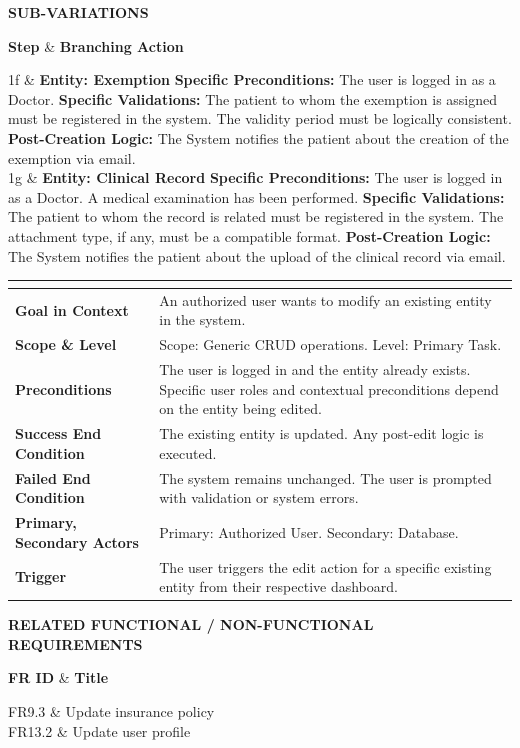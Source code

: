 \documentclass[12pt, a4paper]{article}
\newcommand{\usecaseheader}[9]{
    \vspace{0.5cm}
    \noindent
    \renewcommand{\arraystretch}{1.5}
    \begin{tabularx}{\textwidth}{|>{\columncolor{gray!20}\bfseries}p{4.5cm}|X|}
    \hline
    \rowcolor{blue!10}
    \multicolumn{2}{|c|}{\textbf{USE CASE #1: #2}} \\ \hline
    Goal in Context & #3 \\ \hline
    Scope \& Level & #4 \\ \hline
    Preconditions & #5 \\ \hline
    Success End Condition & #6 \\ \hline
    Failed End Condition & #7 \\ \hline
    Primary, Secondary Actors & #8 \\ \hline
    Trigger & #9 \\ \hline
    \end{tabularx}
    \par\vspace{0.2cm}
}
\newenvironment{ucsubvariations}{
    \noindent\textbf{SUB-VARIATIONS} \par \vspace{0.1cm}
    \noindent
    \renewcommand{\arraystretch}{1.3}
    \tabularx{\textwidth}{|>{\centering\arraybackslash}p{1.2cm}|X|}
    \hline
    \rowcolor{gray!30}
    \textbf{Step} & \textbf{Branching Action} \\ \hline
}{
    \endtabularx
    \par\vspace{0.5cm}
}
\newenvironment{ucrequirements}{
    \noindent\textbf{RELATED FUNCTIONAL / NON-FUNCTIONAL REQUIREMENTS} \par \vspace{0.1cm}
    \noindent
    \renewcommand{\arraystretch}{1.3}
    \tabularx{\textwidth}{|>{\centering\arraybackslash\bfseries}p{2.5cm}|X|}
    \hline
    \rowcolor{gray!30}
    \textbf{FR ID} & \textbf{Title} \\ \hline
}{
    \endtabularx
    \par\vspace{0.5cm}
}
\begin{document}
\begin{ucsubvariations}
    1f & \textbf{Entity: Exemption}\newline
         \textbf{Specific Preconditions:} The user is logged in as a Doctor.\newline
         \textbf{Specific Validations:} The patient to whom the exemption is assigned must be registered in the system. The validity period must be logically consistent.\newline
         \textbf{Post-Creation Logic:} The System notifies the patient about the creation of the exemption via email. \\ \hline
    1g & \textbf{Entity: Clinical Record}\newline
         \textbf{Specific Preconditions:} The user is logged in as a Doctor. A medical examination has been performed.\newline
         \textbf{Specific Validations:} The patient to whom the record is related must be registered in the system. The attachment type, if any, must be a compatible format.\newline
         \textbf{Post-Creation Logic:} The System notifies the patient about the upload of the clinical record via email. \\ \hline
\end{ucsubvariations}
{}
\usecaseheader
  {UC2}  %
  {Entity Edit} %
  {An authorized user wants to modify an existing entity in the system.} %
  {Scope: Generic CRUD operations. Level: Primary Task.} %
  {The user is logged in and the entity already exists. Specific user roles and contextual preconditions depend on the entity being edited.} %
  {The existing entity is updated. Any post-edit logic is executed.} %
  {The system remains unchanged. The user is prompted with validation or system errors.} %
  {Primary: Authorized User. Secondary: Database.} %
  {The user triggers the edit action for a specific existing entity from their respective dashboard.} %
\begin{ucrequirements}

    FR9.3 & Update insurance policy \\ \hline
    FR13.2 & Update user profile \\ \hline
\end{ucrequirements}
\end{document}
